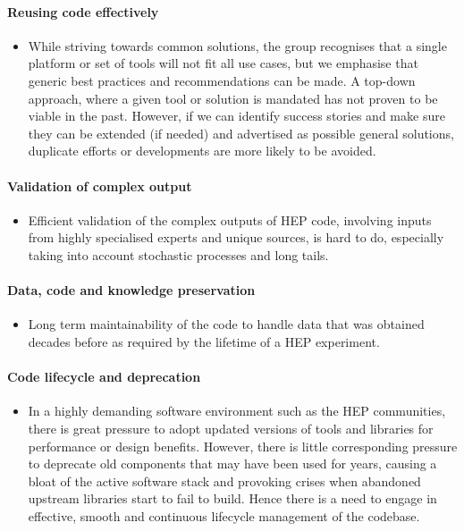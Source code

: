 \documentclass[12pt,a4paper]{article}
\begin{document}
\paragraph{Reusing code effectively}

\begin{itemize}
\item
    While striving towards common solutions, the group recognises that a
  single platform or set of tools will not fit all use cases, but we
  emphasise that generic best practices and recommendations can be made.
  A top-down approach, where a given tool or solution is mandated has
  not proven to be viable in the past. However, if we can
  identify success stories and make sure they can be extended (if
  needed) and advertised as possible general solutions, 
  duplicate efforts or developments are more likely to be avoided.
\end{itemize}

\paragraph{Validation of complex output}

\begin{itemize}
\item
    Efficient validation of the complex outputs of HEP code, involving
  inputs from highly specialised experts and unique sources, is hard to
  do, especially taking into account stochastic processes and long
  tails.
\end{itemize}

\paragraph{Data, code and knowledge preservation}

\begin{itemize}
\item
    Long term maintainability of the code to handle data that was obtained
  decades before as required by the lifetime of a HEP experiment.
\end{itemize}

\paragraph{Code lifecycle and deprecation}

\begin{itemize}
\item
    In a highly demanding software environment such as the HEP
  communities, there is great pressure to adopt updated versions of
  tools and libraries for performance or design benefits. However, there
  is little corresponding pressure to deprecate old components that may
  have been used for years, causing a bloat of the active software stack
  and provoking crises when abandoned upstream libraries start to fail
  to build. Hence there is a need to engage in effective, smooth and
  continuous lifecycle management of the codebase.
\end{itemize}
\end{document}
